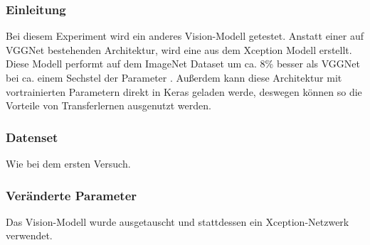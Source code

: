 \documentclass[pdftex,a4paper,halfparskip, article]{scrartcl}
\begin{document}
\subsubsection*{Einleitung}

Bei diesem Experiment wird ein anderes Vision-Modell getestet. Anstatt einer auf VGGNet bestehenden Architektur, wird eine aus dem Xception \cite{DBLP:journals/corr/Chollet16a} Modell erstellt. Diese Modell performt auf dem ImageNet Dataset um ca. 8\% besser als VGGNet bei ca. einem Sechstel der Parameter \cite{kerasModels}. Außerdem kann diese Architektur mit vortrainierten Parametern direkt in Keras geladen werde, deswegen können so die Vorteile von Transferlernen ausgenutzt werden. 

\subsubsection*{Datenset}

Wie bei dem ersten Versuch.

\subsubsection*{Veränderte Parameter}

Das Vision-Modell wurde ausgetauscht und stattdessen ein Xception-Netzwerk verwendet.



 
\end{document}
